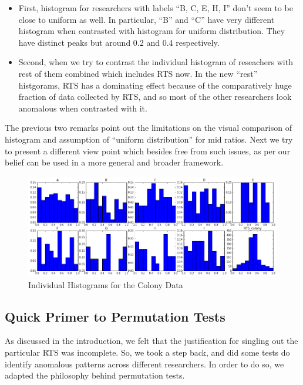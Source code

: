 \documentclass{article}
\begin{document}
\begin{itemize}
\item
  First, histogram for researchers with labels ``B, C, E, H, I'' don't
  seem to be close to uniform as well. In particular, ``B'' and ``C''
  have very different histogram when contrasted with histogram for
  uniform distribution. They have distinct peaks but around 0.2 and 0.4
  respectively.
\item
  Second, when we try to contrast the individual histogram of reseachers
  with rest of them combined which includes RTS now. In the new ``rest''
  histgorams, RTS has a dominating effect because of the comparatively
  huge fraction of data collected by RTS, and so most of the other
  researchers look anomalous when contrasted with it.
\end{itemize}

The previous two remarks point out the limitations on the visual
comparison of histogram and assumption of ``uniform distribution'' for
mid ratios. Next we try to present a different view point which besides
free from such issues, as per our belief can be used in a more general
and broader framework.

\begin{figure}[htbp]
\centering
\includegraphics{images/mid_ratio_hist.png}
\caption{Individual Histograms for the Colony Data}
\end{figure}

    \subsection{Quick Primer to Permutation
Tests}\label{quick-primer-to-permutation-tests}

As discussed in the introduction, we felt that the justification for
singling out the particular RTS was incomplete. So, we took a step back,
and did some tests do identify anomalous patterns across different
researchers. In order to do so, we adapted the philosophy behind
permutation tests.
\end{document}
